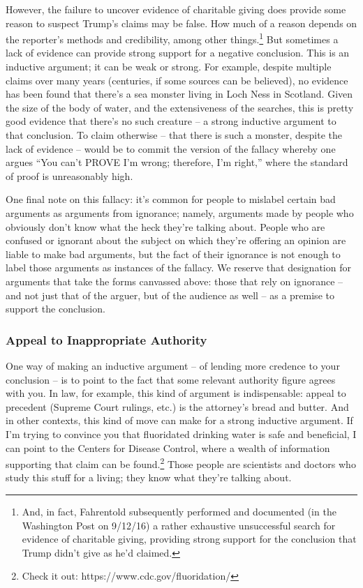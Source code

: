 However, the failure to uncover evidence of charitable giving does provide some reason to suspect
Trump's claims may be false. How much of a reason depends on the reporter's methods and
credibility, among other things.\footnote{And, in fact, Fahrentold subsequently performed and documented (in the Washington Post on 9/12/16) a rather
exhaustive unsuccessful search for evidence of charitable giving, providing strong support for the conclusion that
Trump didn't give as he'd claimed.}
But sometimes a lack of evidence can provide strong support for
a negative conclusion. This is an inductive argument; it can be weak or strong. For example,
despite multiple claims over many years (centuries, if some sources can be believed), no evidence
has been found that there's a sea monster living in Loch Ness in Scotland. Given the size of the
body of water, and the extensiveness of the searches, this is pretty good evidence that there's no
such creature -- a strong inductive argument to that conclusion. To claim otherwise -- that there is
such a monster, despite the lack of evidence -- would be to commit the version of the fallacy
whereby one argues ``You can't PROVE I'm wrong; therefore, I'm right,'' where the standard of
proof is unreasonably high.

One final note on this fallacy: it's common for people to mislabel certain bad arguments as
arguments from ignorance; namely, arguments made by people who obviously don't know what
the heck they're talking about. People who are confused or ignorant about the subject on which
they're offering an opinion are liable to make bad arguments, but the fact of their ignorance is not
enough to label those arguments as instances of the fallacy. We reserve that designation for
arguments that take the forms canvassed above: those that rely on ignorance -- and not just that of
the arguer, but of the audience as well -- as a premise to support the conclusion.

\subsubsection{Appeal to Inappropriate Authority}
One way of making an inductive argument -- of lending more credence to your conclusion -- is to
point to the fact that some relevant authority figure agrees with you. In law, for example, this kind
of argument is indispensable: appeal to precedent (Supreme Court rulings, etc.) is the attorney's
bread and butter. And in other contexts, this kind of move can make for a strong inductive
argument. If I'm trying to convince you that fluoridated drinking water is safe and beneficial, I can
point to the Centers for Disease Control, where a wealth of information supporting that claim can
be found.\footnote{Check it out: https://www.cdc.gov/fluoridation/} 
Those people are scientists and doctors who study this stuff for a living; they know
what they’re talking about.

